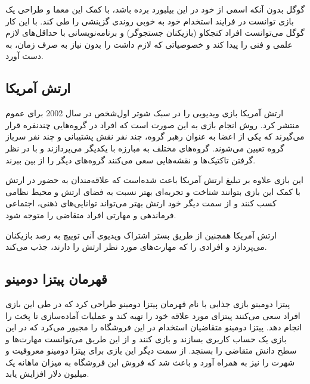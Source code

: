 گوگل بدون آنکه اسمی از خود در این بیلبورد برده باشد، با کمک این معما و طراحی یک بازی توانست در فرایند استخدام خود به خوبی روندی گزینشی را طی کند. با این کار گوگل می‌توانست افراد کنجکاو (بازیکنان جستجوگر) و برنامه‌نویسانی با حداقل‌های لازم علمی و فنی را پیدا کند و خصوصیاتی که لازم داشت را بدون نیاز به صرف زمان، به دست آورد.

\subsection{ارتش آمریکا}
ارتش آمریکا بازی ویدیویی \href{https://www.americasarmy.com/}{} را  در سبک شوتر اول‌شخص در سال 2002 برای عموم منتشر کرد. روش انجام بازی به این صورت است که افراد در گروه‌هایی چندنفره قرار می‌گیرند که یکی از اعضا به عنوان رهبر گروه، چند نفر نقش پشتیبانی و چند نفر سرباز گروه تعیین می‌شوند. گروه‌های مختلف به مبارزه با یکدیگر می‌پردازند و با در نظر گرفتن تاکتیک‌ها و نقشه‌هایی سعی می‌کنند گروه‌های دیگر را از بین ببرند.

این بازی علاوه بر تبلیغ ارتش آمریکا باعث شده‌است که علاقه‌مندان به حضور در ارتش با کمک این بازی بتوانند شناخت و تجربه‌ای بهتر نسبت به فضای ارتش و محیط نظامی کسب کنند و از سمت دیگر خود ارتش بهتر می‌تواند توانایی‌های ذهنی، اجتماعی فرماندهی و مهارتی افراد متقاضی را متوجه شود.

ارتش آمریکا همچنین از طریق بستر اشتراک ویدیوی آنی توییچ به رصد بازیکنان می‌پردازد و افرادی را که مهارت‌های مورد نظر ارتش را دارند، جذب می‌کند.

\subsection{قهرمان پیتزا دومینو}
پیتزا دومینو بازی جذابی با نام قهرمان پیتزا دومینو طراحی کرد که در طی این بازی افراد سعی می‌کنند پیتزای مورد علاقه خود را تهیه کند و عملیات آماده‌سازی تا پخت را انجام دهد. پیتزا دومینو متقاضیان استخدام در این فروشگاه را مجبور می‌کرد که در این بازی یک حساب کاربری بسازند و بازی کنند و از این طریق می‌توانست مهارت‌ها و سطح دانش متقاضی را بسنجد. از سمت دیگر این بازی برای پیتزا دومینو معروفیت و شهرت را نیز به همراه آورد و باعث شد که فروش این فروشگاه به میزان ماهانه یک میلیون دلار افزایش یابد.

